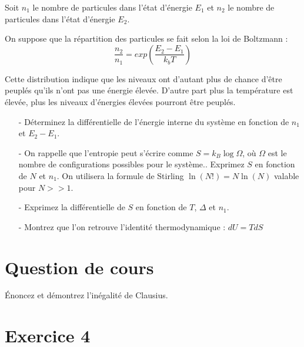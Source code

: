 \documentclass{report}
\begin{document}
Soit $n_{1}$ le nombre de particules dans l'état d'énergie $E_{1}$ et $n_{2}$ le nombre de particules dans l'état d'énergie $E_{2}$.

On suppose que la répartition des particules se fait selon la loi de Boltzmann :
\begin{equation}
\frac{n_{2}}{n_{1}}=exp\left( \frac{E_{2}-E_{1}}{k_{b}T}\right) 
\end{equation}

Cette distribution indique que les niveaux ont d'autant plus de chance d'être peuplés qu'ils n'ont pas une énergie élevée. D'autre part plus la température est élevée, plus les niveaux d'énergies élevées pourront être peuplés. 

\begin{itemize}
\item[-]Déterminez la différentielle de l'énergie interne du système en fonction de $n_{1}$ et $E_{2}-E_{1}$.
\item[-]On rappelle que l'entropie peut s'écrire comme $S=k_B\log\Omega$, où $\Omega$ est le nombre de configurations possibles pour le système.. Exprimez $S$ en fonction de $N$ et $n_1$. On utilisera la formule de Stirling $\ln (N!)=N \ln (N)$ valable pour $N>>1$.
\item[-] Exprimez la différentielle de $S$ en fonction de $T$, $\Delta$ et $n_1$.
\item[-] Montrez que l'on retrouve l'identité thermodynamique : $dU = TdS$
\end{itemize}

\newpage

\section*{Question de cours}
Énoncez et démontrez l’inégalité de Clausius.

\section*{Exercice 4}
\end{document}
